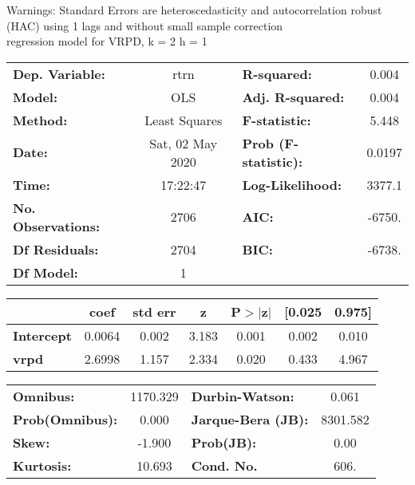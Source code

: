 Warnings: \newline
 [1] Standard Errors are heteroscedasticity and autocorrelation robust (HAC) using 1 lags and without small sample correction\\ 

regression model for VRPD, k = 2 h = 1\begin{center}
\begin{tabular}{lclc}
\toprule
\textbf{Dep. Variable:}    &       rtrn       & \textbf{  R-squared:         } &     0.004   \\
\textbf{Model:}            &       OLS        & \textbf{  Adj. R-squared:    } &     0.004   \\
\textbf{Method:}           &  Least Squares   & \textbf{  F-statistic:       } &     5.448   \\
\textbf{Date:}             & Sat, 02 May 2020 & \textbf{  Prob (F-statistic):} &   0.0197    \\
\textbf{Time:}             &     17:22:47     & \textbf{  Log-Likelihood:    } &    3377.1   \\
\textbf{No. Observations:} &        2706      & \textbf{  AIC:               } &    -6750.   \\
\textbf{Df Residuals:}     &        2704      & \textbf{  BIC:               } &    -6738.   \\
\textbf{Df Model:}         &           1      & \textbf{                     } &             \\
\bottomrule
\end{tabular}
\begin{tabular}{lcccccc}
                   & \textbf{coef} & \textbf{std err} & \textbf{z} & \textbf{P$> |$z$|$} & \textbf{[0.025} & \textbf{0.975]}  \\
\midrule
\textbf{Intercept} &       0.0064  &        0.002     &     3.183  &         0.001        &        0.002    &        0.010     \\
\textbf{vrpd}      &       2.6998  &        1.157     &     2.334  &         0.020        &        0.433    &        4.967     \\
\bottomrule
\end{tabular}
\begin{tabular}{lclc}
\textbf{Omnibus:}       & 1170.329 & \textbf{  Durbin-Watson:     } &    0.061  \\
\textbf{Prob(Omnibus):} &   0.000  & \textbf{  Jarque-Bera (JB):  } & 8301.582  \\
\textbf{Skew:}          &  -1.900  & \textbf{  Prob(JB):          } &     0.00  \\
\textbf{Kurtosis:}      &  10.693  & \textbf{  Cond. No.          } &     606.  \\
\bottomrule
\end{tabular}
\end{center}

